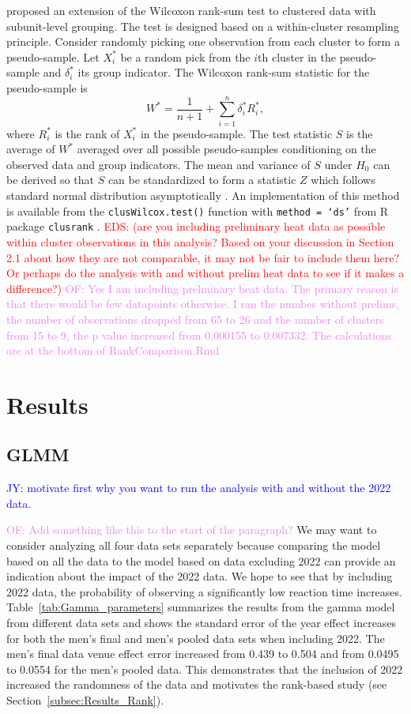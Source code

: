 \documentclass[12pt, letterpaper, titlepage]{article}
\newcommand{\jy}[1]{\textcolor{blue}{JY: #1}}
\newcommand{\eds}[1]{\textcolor{red}{EDS: (#1)}}
\newcommand{\of}[1]{\textcolor{violet}{OF: #1}}
\begin{document}
\citet{datta2005rank} proposed an extension of the Wilcoxon rank-sum test to
clustered data with subunit-level grouping. The test is designed based on a
within-cluster resampling principle. Consider randomly picking one observation
from each cluster to form a pseudo-sample. Let $X_i^*$ be a random pick from the
$i$th cluster in the pseudo-sample and $\delta_i^*$ its group indicator. The
Wilcoxon rank-sum statistic for the pseudo-sample is
\[
W^* = \frac{1}{n + 1} + \sum_{i=1}^{n} \delta_{i}^{*} R_{i}^{*},
\]
where $R_{i}^{*}$ is the rank of $X_{i}^{*}$ in the pseudo-sample.
The test statistic $S$ is the average of $W^*$ averaged over all possible
pseudo-samples conditioning on the observed data and group indicators.
The mean and variance of $S$ under $H_0$ can be derived so that $S$ can be
standardized to form a statistic $Z$ which follows standard normal distribution
asymptotically \citep[p.910]{datta2005rank}. An implementation of this method is
available from the \texttt{clusWilcox.test()} function with
\texttt{method = `ds'} from R package \texttt{clusrank}
\citep{jiang2017wilcoxon}.
\eds{are you including preliminary heat data as possible within cluster 
observations in this analysis?  Based on your 
discussion in Section 2.1 about how they are not comparable, it may not be fair 
to include them here?  Or perhaps do the analysis with and without prelim heat
data to see if it makes a difference?}
\of{Yes I am including prelminary heat data.  The primary reason is that there
would be few datapoints otherwise.  I ran the numbes without prelims, the number
of observations dropped from 65 to 26 and the number of clusters from 15 to 9, the
p value increased from 0.000155 to 0.007332.
The calculations are at the bottom of RankComparison.Rmd}


\section{Results} \label{sec:Results}

\subsection{GLMM} \label{subsec:Results_GLMM}

\jy{motivate first why you want to run the analysis with and without the 2022 data.}

\of{Add something like this to the start of the paragraph?}
We may want to consider analyzing all four data sets separately because
comparing the model based on all the data to the model based on data excluding 
2022 can provide an indication about the impact of the 2022 data.
We hope to see that by including 2022 data,
the probability of observing a significantly low reaction time increases. 
Table~\ref{tab:Gamma_parameters} summarizes the results from the gamma model 
from different data sets and shows the standard error of the year
effect increases for both the men's final and men's pooled data sets when
including 2022.  The men's final data venue effect error increased from 0.439
to 0.504 and from 0.0495 to 0.0554 for the men's pooled data.  This demonstrates
that the inclusion of 2022 increased the randomness of the data and motivates
the rank-based study (see Section~\ref{subsec:Results_Rank}).
\end{document}
